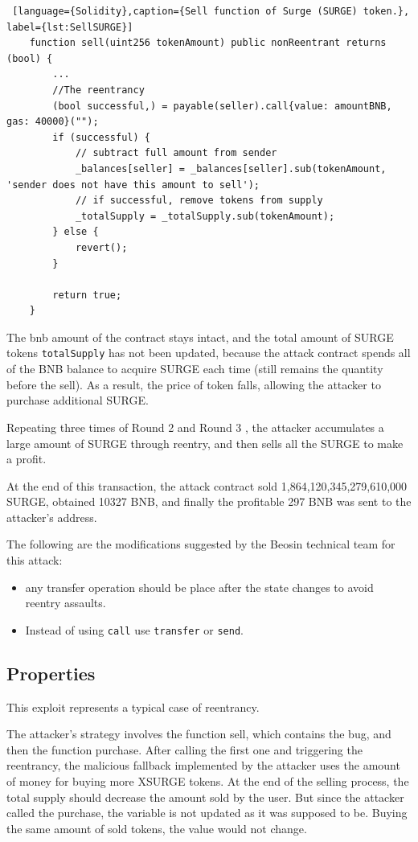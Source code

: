 \begin{lstlisting} [language={Solidity},caption={Sell function of Surge (SURGE) token.}, label={lst:SellSURGE}]
    function sell(uint256 tokenAmount) public nonReentrant returns (bool) {
        ...
        //The reentrancy 
        (bool successful,) = payable(seller).call{value: amountBNB, gas: 40000}(""); 
        if (successful) {
            // subtract full amount from sender
            _balances[seller] = _balances[seller].sub(tokenAmount, 'sender does not have this amount to sell');
            // if successful, remove tokens from supply
            _totalSupply = _totalSupply.sub(tokenAmount);
        } else {
            revert();
        }
        
        return true;
    }
\end{lstlisting}


The bnb amount of the contract stays intact, and the total amount of SURGE tokens \texttt{totalSupply}  
has not been updated, because the attack contract spends all of the BNB balance to acquire SURGE each time (still remains the quantity before the sell).
As a result, the price of token falls, allowing the attacker to purchase additional SURGE. 

Repeating three times of Round 2 and Round 3 , the attacker accumulates a large amount of SURGE through reentry, and then sells all the SURGE to make a profit.

At the end of this transaction, the attack contract sold 1,864,120,345,279,610,000 SURGE, 
obtained 10327 BNB, and finally the profitable 297 BNB was sent to the attacker's address.

The following are the modifications suggested by the Beosin technical team for this attack:
\begin{itemize}
    \item any transfer operation should be place after the state changes to avoid reentry assaults.
    \item Instead of using \texttt{call} use \texttt{transfer} or \texttt{send}. 
\end{itemize}

\subsection{Properties}

This exploit represents a typical case of reentrancy. 

The attacker's strategy involves the function sell, which contains the bug, and then the function purchase. 
After calling the first one and triggering the reentrancy, the malicious fallback implemented by the attacker uses the amount of money for buying more XSURGE tokens. 
At the end of the selling process, the total supply should decrease the amount sold by the user.
But since the attacker called the purchase, the variable is not updated as it was supposed to be. 
Buying the same amount of sold tokens, the value would not change.

